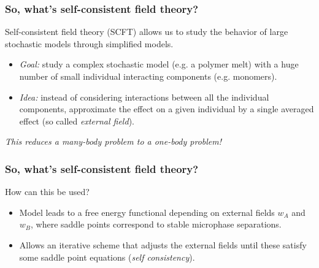 \begin{frame}[t]
    \frametitle{So, what's self-consistent field theory?}

    Self-consistent field theory (SCFT) allows us to study the behavior of large stochastic models through simplified models.

    \vfill
    \begin{itemize}
        \item \emph{Goal:} study a complex stochastic model (e.g. a polymer melt) with a huge number of small individual interacting components (e.g. monomers).
        \item \emph{Idea:} instead of considering interactions between all the individual components, approximate the effect on a given individual by a single averaged effect (so called \emph{external field}).
    \end{itemize}

    \vfill
    \centering
    \emph{This reduces a many-body problem to a one-body problem!}
\end{frame}

\begin{frame}[t]
    \frametitle{So, what's self-consistent field theory?}

    How can this be used?


    \begin{itemize}
        \item Model leads to a free energy functional depending on external fields $w_{A}$ and $w_{B}$, where saddle points correspond to stable microphase separations.
        \item Allows an iterative scheme that adjusts the external fields until these satisfy some saddle point equations (\emph{self consistency}).
    \end{itemize}
\end{frame}

